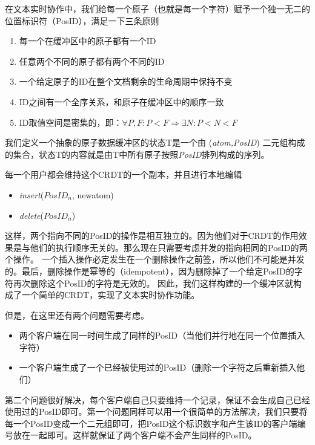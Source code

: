 \documentclass[11pt]{ctexart}
\begin{document}
在文本实时协作中，我们给每一个原子（也就是每一个字符）赋予一个独一无二的位置标识符（PosID），满足一下三条原则
\begin{enumerate}
	\item 每一个在缓冲区中的原子都有一个ID
	\item 任意两个不同的原子都有两个不同的ID
	\item 一个给定原子的ID在整个文档剩余的生命周期中保持不变
	\item ID之间有一个全序关系，和原子在缓冲区中的顺序一致
	\item ID取值空间是密集的，即：$\forall P, F : P < F \Rightarrow \exists N: P < N < F$
\end{enumerate}
我们定义一个抽象的原子数据缓冲区的状态T是一个由 (\textit{atom,PosID}) 二元组构成的集合，状态T的内容就是由T中所有原子按照\textit{PosID}排列构成的序列。 

每一个用户都会维持这个CRDT的一个副本，并且进行本地编辑
\begin{itemize}
	\item \textit{insert}($\mathit{PosID_{n}}$, newatom)
	\item \textit{delete}($\mathit{PosID_{n}}$)
\end{itemize}
这样，两个指向不同的PosID的操作是相互独立的。因为他们对于CRDT的作用效果是与他们的执行顺序无关的。那么现在只需要考虑并发的指向相同的PosID的两个操作。
一个插入操作必定发生在一个删除操作之前签，所以他们不可能是并发的。最后，删除操作是幂等的（idempotent），因为删除掉了一个给定PosID的字符再次删除这个PosID的字符是无效的。
因此，我们这样构建的一个缓冲区就构成了一个简单的CRDT，实现了文本实时协作功能。

但是，在这里还有两个问题需要考虑。
\begin{itemize}
	\item 两个客户端在同一时间生成了同样的PosID（当他们并行地在同一个位置插入字符）
	\item 一个客户端生成了一个已经被使用过的PosID（删除一个字符之后重新插入他们）
\end{itemize}

第二个问题很好解决，每个客户端自己只要维持一个记录，保证不会生成自己已经使用过的PosID即可。第一个问题同样可以用一个很简单的方法解决，我们只要将每一个PosID变成一个二元组即可，把PosID这个标识数字和产生该ID的客户端编号放在一起即可。这样就保证了两个客户端不会产生同样的PosID。
\nocite{*}


\end{document}
